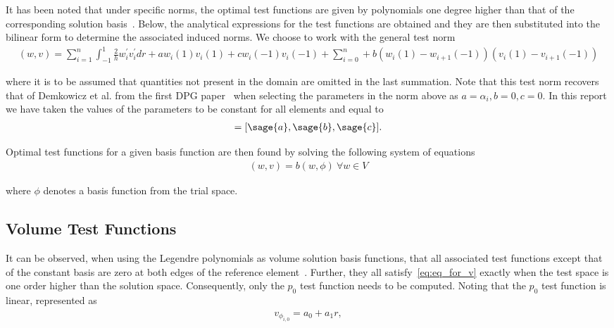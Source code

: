\documentclass{article}
\numberwithin{equation}{section}
\newcommand{\makeblue}[1]{{\color{blue}#1}}
\begin{document}
It has been noted that under specific norms, the optimal test functions are given by polynomials one degree higher than
that of the corresponding solution basis~\cite[Section \makeblue{3C}]{Demkowicz2011}. Below, the analytical expressions
for the test functions are obtained and they are then substituted into the bilinear form to determine the associated
    induced norms. We choose to work with the general test norm
\begin{align}
(w,v) = \sum_{i=1}^{n}
\int_{-1}^{1} \frac{2}{h} w_i^{'}v_i^{'} dr
+ a w_i(1)v_i(1)
+ c w_{i}(-1)v_{i}(-1)
+ \sum_{i=0}^{n}
+ b(w_i(1)-w_{i+1}(-1))(v_i(1)-v_{i+1}(-1))
\end{align}

where it is to be assumed that quantities not present in the domain are omitted in the last summation. Note that this test
norm recovers that of Demkowicz et al. from the first DPG paper~\cite[Section \makeblue{2C}]{Demkowicz2011} when
selecting the parameters in the norm above as $a = \alpha_i, b = 0, c = 0$. In this report we have taken the values of
the parameters to be constant for all elements and equal to
\begin{align}
[a,b,c] = [\sage{a},\sage{b},\sage{c}].
\end{align}

Optimal test functions for a given basis function are then found by solving the following system of equations
\begin{align} \label{eq:eq_for_v}
(w,v) = b(w,\phi)\ \forall w \in V
\end{align}

where $\phi$ denotes a basis function from the trial space.

\subsection{Volume Test Functions}

It can be observed, when using the Legendre polynomials as volume solution basis functions, that all associated
test functions except that of the constant basis are zero at both edges of the reference element~\cite[Section
5.1]{BuiThanh2013}. Further, they all satisfy~\eqref{eq:eq_for_v} exactly when the test space is one order higher than
the solution space. Consequently, only the $p_0$ test function needs to be computed. Noting that the $p_0$ test function is
linear, represented as
\begin{align}
v_{{\phi}_{i,0}} = a_0 + a_1 r,
\end{align}
\end{document}
